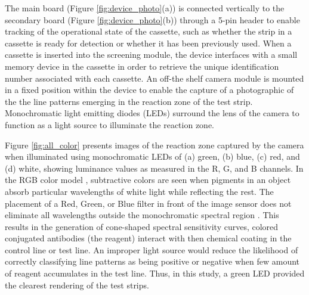 The main board (Figure \ref{fig:device_photo}(a)) is connected vertically to the secondary board (Figure \ref{fig:device_photo}(b)) through a 5-pin header to enable tracking of the operational state of the cassette, such as whether the strip in a cassette is ready for detection or whether it has been previously used. When a cassette is inserted into the screening module, the device interfaces with a small memory device in the cassette in order to retrieve the unique identification number associated with each cassette. An off-the shelf camera module is mounted in a fixed position within the device to enable the capture of a photographic of the the line patterns emerging in the reaction zone of the test strip. Monochromatic light emitting diodes (LEDs) surround the lens of the camera to function as a light source to illuminate the reaction zone.


Figure \ref{fig:all_color} presents images of the reaction zone captured by the camera when illuminated using monochromatic LEDs of (a) green, (b) blue, (c) red, and (d) white, showing luminance values as measured in the R, G, and B channels. In the RGB color model \cite{Forsyth:2002:CVM:580035}, subtractive colors are seen when pigments in an object absorb particular wavelengths of white light while reflecting the rest. The placement of a Red, Green, or Blue filter in front of the image sensor does not eliminate all wavelengths outside the monochromatic spectral region \cite{s8117300}. This results in the generation of cone-shaped spectral sensitivity curves, colored conjugated antibodies (the reagent) \cite{dasgupta2011health} interact with then chemical coating in the control line or test line. 
An improper light source would reduce the likelihood of correctly classifying line patterns as being positive or negative when few amount of reagent accumulates in the test line.
Thus, in this study, a green LED provided the clearest rendering of the test strips.

